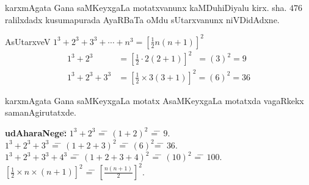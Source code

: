 karxmAgata Gana saMKeyxgaLa motatxvanunx kaMDuhiDiyalu kirx. sha. $476$ ralilxdadx kusumapurada AyaRBaTa oMdu sUtarxvanunx niVDidAdxne. 

AsUtarxveV  $1^{3}+2^{3}+3^{3}+\cdots+n^{3}=\left[\frac{1}{2}n(n+1)\right]^{2}$
\begin{align*}
1^{3}+2^{3} &=\left[\frac{1}{2}\cdot 2(2+1)\right]^2 \;\; = (3)^2 = 9\\
1^{3}+2^{3}+3^{3} &=\left[\frac{1}{2}\times 3(3+1)\right]^2 = (6)^2 = 36
\end{align*}

karxmAgata Gana saMKeyxgaLa motatx AsaMKeyxgaLa motatxda vagaRkekx samanAgirutatxde.
\begin{tabbing}
\textbf{udAharaNege:}\qquad \= $1^{3}+2^{3}$ \= = \= $(1+2)^{2}$ \= = \= $9$. \\
\> $1^{3}+2^{3}+3^{3}$ \= = \= $(1+2+3)^2$ \= = \= $(6)^2$\=  = \= $36$.\\
\> $1^{3}+2^{3}+3^{3}+4^{3}$ \= = \=  $(1+2+3+4)^2$ \= = \= $(10)^2$ \= = \= $100$.\\
\> $\left[\frac{1}{2}\times n \times (n+1)\right]^2$ \= = \= $\left[\frac{n(n+1)}{2}\right]^2$.
\end{tabbing}
